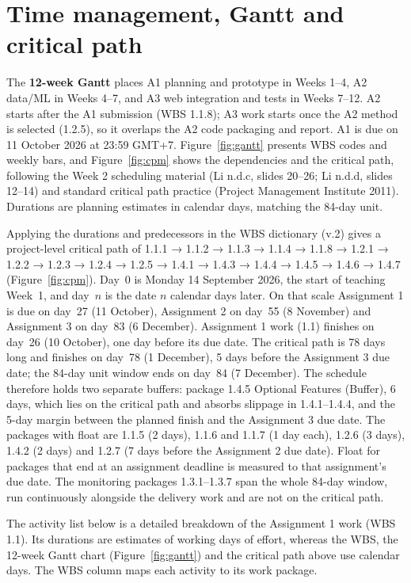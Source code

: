 \section{Time management, Gantt and critical path}
\label{sec:schedule}

The \textbf{12-week Gantt} places A1 planning and prototype in Weeks 1–4, A2 data/ML in Weeks 4–7, and A3 web integration and tests in Weeks 7–12. A2 starts after the A1 submission (WBS 1.1.8); A3 work starts once the A2 method is selected (1.2.5), so it overlaps the A2 code packaging and report. A1 is due on 11 October 2026 at 23:59 GMT+7. Figure~\ref{fig:gantt} presents WBS codes and weekly bars, and Figure~\ref{fig:cpm} shows the dependencies and the critical path, following the Week 2 scheduling material (Li n.d.c, slides 20–26; Li n.d.d, slides 12–14) and standard critical path practice (Project Management Institute 2011). Durations are planning estimates in calendar days, matching the 84-day unit.

Applying the durations and predecessors in the WBS dictionary (v.2) gives a project-level critical path of 1.1.1 → 1.1.2 → 1.1.3 → 1.1.4 → 1.1.8 → 1.2.1 → 1.2.2 → 1.2.3 → 1.2.4 → 1.2.5 → 1.4.1 → 1.4.3 → 1.4.4 → 1.4.5 → 1.4.6 → 1.4.7 (Figure~\ref{fig:cpm}). Day~0 is Monday 14 September 2026, the start of teaching Week~1, and day~$n$ is the date $n$ calendar days later. On that scale Assignment 1 is due on day~27 (11 October), Assignment 2 on day~55 (8 November) and Assignment 3 on day~83 (6 December). Assignment 1 work (1.1) finishes on day~26 (10 October), one day before its due date. The critical path is 78 days long and finishes on day~78 (1 December), 5 days before the Assignment 3 due date; the 84-day unit window ends on day~84 (7 December). The schedule therefore holds two separate buffers: package 1.4.5 Optional Features (Buffer), 6 days, which lies on the critical path and absorbs slippage in 1.4.1–1.4.4, and the 5-day margin between the planned finish and the Assignment 3 due date. The packages with float are 1.1.5 (2 days), 1.1.6 and 1.1.7 (1 day each), 1.2.6 (3 days), 1.4.2 (2 days) and 1.2.7 (7 days before the Assignment 2 due date). Float for packages that end at an assignment deadline is measured to that assignment's due date. The monitoring packages 1.3.1–1.3.7 span the whole 84-day window, run continuously alongside the delivery work and are not on the critical path.

The activity list below is a detailed breakdown of the Assignment 1 work (WBS 1.1). Its durations are estimates of working days of effort, whereas the WBS, the 12-week Gantt chart (Figure~\ref{fig:gantt}) and the critical path above use calendar days. The WBS column maps each activity to its work package.

